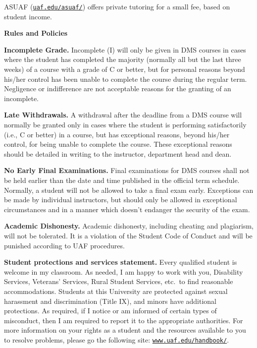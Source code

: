 \documentclass[12pt]{article}
\renewcommand{\emph}[1]{\textsf{\textbf{#1}}}
\newcommand{\localhead}[1]{\par\smallskip\textbf{#1} \smallskip\nobreak\\}%
\def\heading#1{\localhead{\large\emph{#1}}}
\begin{document}
ASUAF (\href{https://uaf.edu/asuaf/}{\texttt{uaf.edu/asuaf/}}) offers private tutoring for a small fee, based on student income.


\small

\bigskip
\heading{Rules and Policies}
\vskip -10pt

\emph{Incomplete Grade.}  Incomplete (I) will only be given in
  DMS courses in cases where
  the student has completed the majority (normally all but the last
  three weeks) of a course with a grade of C or better, but for
  personal reasons beyond his/her control has been unable to complete
  the course during the regular term. Negligence or indifference are
  not acceptable reasons for the granting of an incomplete. 

\emph{Late Withdrawals.}  A withdrawal after the deadline from a DMS course will
  normally be granted only in cases where the student is performing
  satisfactorily (i.e., C or better) in a course, but has exceptional
  reasons, beyond his/her control, for being unable to complete the
  course. These exceptional reasons should be detailed in writing to
  the instructor, department head and dean.

\emph{No Early Final Examinations.}  Final examinations for DMS
  courses shall not be held earlier than the date and time published
  in the official term schedule. Normally, a student will not be
  allowed to take a final exam early. Exceptions can be made by
  individual instructors, but should only be allowed in exceptional
  circumstances and in a manner which doesn't endanger the security of
  the exam.

\emph{Academic Dishonesty.}  Academic dishonesty, including cheating and plagiarism, will not be tolerated.  It is a violation of the Student Code of Conduct
and will be punished according to UAF procedures.

\emph{Student protections and services statement.}  Every qualified student is welcome in my classroom.  As needed, I am happy to work with you, Disability Services, Veterans' Services, Rural Student Services, etc.~to find reasonable accommodations.  Students at this University are protected against sexual harassment and discrimination (Title IX), and minors have additional protections.  As required, if I notice or am informed of certain types of misconduct, then I am required to report it to the appropriate authorities.  For more information on your rights as a student and the resources available to you to resolve problems, please go the following site: \href{https://www.uaf.edu/handbook/}{\texttt{www.uaf.edu/handbook/}}.
\end{document}
